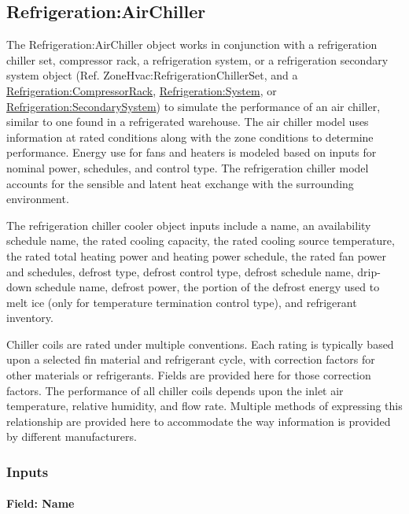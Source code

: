 \subsection{Refrigeration:AirChiller}\label{refrigerationairchiller}

The Refrigeration:AirChiller object works in conjunction with a refrigeration chiller set, compressor rack, a refrigeration system, or a refrigeration secondary system object (Ref. ZoneHvac:RefrigerationChillerSet, and a \hyperref[refrigerationcompressorrack]{Refrigeration:CompressorRack}, \hyperref[refrigerationsystem]{Refrigeration:System}, or \hyperref[refrigerationsecondarysystem]{Refrigeration:SecondarySystem}) to simulate the performance of an air chiller, similar to one found in a refrigerated warehouse. The air chiller model uses information at rated conditions along with the zone conditions to determine performance. Energy use for fans and heaters is modeled based on inputs for nominal power, schedules, and control type. The refrigeration chiller model accounts for the sensible and latent heat exchange with the surrounding environment.

The refrigeration chiller cooler object inputs include a name, an availability schedule name, the rated cooling capacity, the rated cooling source temperature, the rated total heating power and heating power schedule, the rated fan power and schedules, defrost type, defrost control type, defrost schedule name, drip-down schedule name, defrost power, the portion of the defrost energy used to melt ice (only for temperature termination control type), and refrigerant inventory.

Chiller coils are rated under multiple conventions. Each rating is typically based upon a selected fin material and refrigerant cycle, with correction factors for other materials or refrigerants. Fields are provided here for those correction factors. The performance of all chiller coils depends upon the inlet air temperature, relative humidity, and flow rate. Multiple methods of expressing this relationship are provided here to accommodate the way information is provided by different manufacturers.

\subsubsection{Inputs}\label{inputs-15-011}

\paragraph{Field: Name}\label{field-name-16-007}

